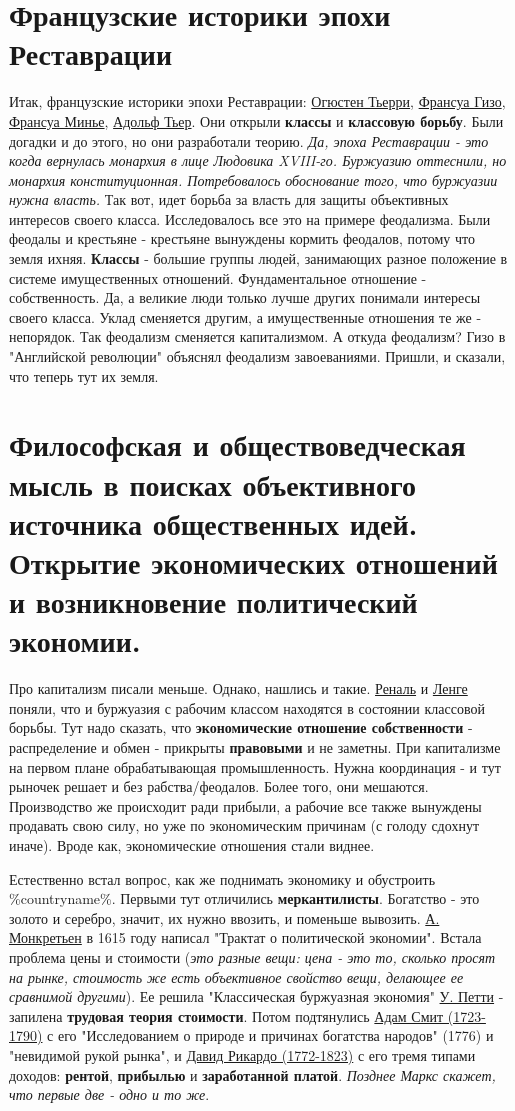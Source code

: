 \section{Французские историки эпохи Реставрации}
Итак, французские историки эпохи Реставрации: \underline{Огюстен Тьерри}, \underline{Франсуа Гизо}, \underline{Франсуа Минье}, \underline{Адольф Тьер}. Они открыли \textbf{классы} и \textbf{ классовую борьбу}. Были догадки и до этого, но они разработали теорию. \textit{Да, эпоха Реставрации - это когда вернулась монархия в лице Людовика XVIII-го. Буржуазию оттеснили, но монархия конституционная. Потребовалось обоснование того, что буржуазии нужна власть.} Так вот, идет борьба за власть для защиты объективных интересов своего класса. Исследовалось все это на примере феодализма. Были феодалы и крестьяне - крестьяне вынуждены кормить феодалов, потому что земля ихняя. \textbf{Классы} - большие группы людей, занимающих разное положение в системе имущественных отношений. Фундаментальное отношение - собственность. Да, а великие люди только лучше других понимали интересы своего класса. Уклад сменяется другим, а имущественные отношения те же - непорядок. Так феодализм сменяется капитализмом. А откуда феодализм? Гизо в "Английской революции" объяснял феодализм завоеваниями. Пришли, и сказали, что теперь тут их земля.


\section{Философская и обществоведческая мысль в поисках объективного источника общественных идей. Открытие экономических отношений и возникновение политический экономии.}
Про капитализм писали меньше. Однако, нашлись и такие. \underline{Реналь} и \underline{Ленге} поняли, что и буржуазия с рабочим классом находятся в состоянии классовой борьбы. Тут надо сказать, что \textbf{экономические отношение собственности} - распределение и обмен - прикрыты \textbf{правовыми} и не заметны. При капитализме на первом плане обрабатывающая промышленность. Нужна координация - и тут рыночек решает и без рабства/феодалов. Более того, они мешаются. Производство же происходит ради прибыли, а рабочие все также вынуждены продавать свою силу, но уже по экономическим причинам (с голоду сдохнут иначе). Вроде как, экономические отношения стали виднее. 

Естественно встал вопрос, как же поднимать экономику и обустроить \%countryname\%. Первыми тут отличились \textbf{меркантилисты}. Богатство - это золото и серебро, значит, их нужно ввозить, и поменьше вывозить. \underline{А. Монкретьен} в 1615 году написал "Трактат о политической экономии". Встала проблема цены и стоимости (\textit{это разные вещи: цена - это то, сколько просят на рынке, стоимость же есть объективное свойство вещи, делающее ее сравнимой  другими}). Ее решила "Классическая буржуазная экономия" \underline{У. Петти} - запилена \textbf{трудовая теория стоимости}. Потом подтянулись \underline{Адам Смит (1723-1790)} с его "Исследованием о природе и причинах богатства народов" (1776) и "невидимой рукой рынка", и \underline{Давид Рикардо (1772-1823)} с его тремя типами доходов: \textbf{рентой}, \textbf{прибылью} и \textbf{заработанной платой}. \textit{Позднее Маркс скажет, что первые две - одно и то же}.

